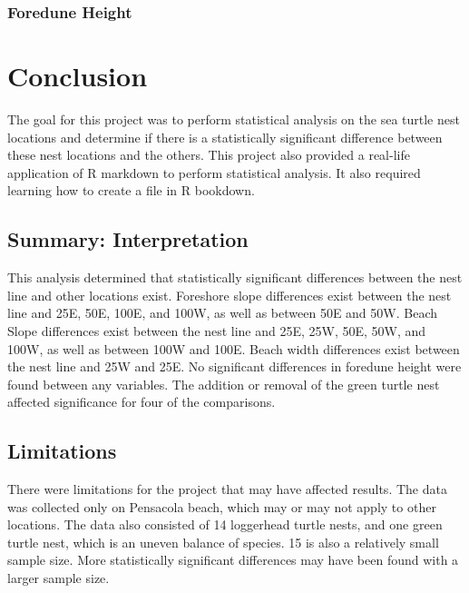 \documentclass[
]{article}
\begin{document}
\hypertarget{foredune-height}{%
\subsubsection{Foredune Height}\label{foredune-height}}

\hypertarget{conclusion}{%
\section{Conclusion}\label{conclusion}}

The goal for this project was to perform statistical analysis on the sea turtle nest locations and determine if there is a statistically significant difference between these nest locations and the others. This project also provided a real-life application of R markdown to perform statistical analysis. It also required learning how to create a file in R bookdown.

\hypertarget{summary-interpretation}{%
\subsection{Summary: Interpretation}\label{summary-interpretation}}

This analysis determined that statistically significant differences between the nest line and other locations exist. Foreshore slope differences exist between the nest line and 25E, 50E, 100E, and 100W, as well as between 50E and 50W. Beach Slope differences exist between the nest line and 25E, 25W, 50E, 50W, and 100W, as well as between 100W and 100E. Beach width differences exist between the nest line and 25W and 25E. No significant differences in foredune height were found between any variables. The addition or removal of the green turtle nest affected significance for four of the comparisons.

\hypertarget{limitations}{%
\subsection{Limitations}\label{limitations}}

There were limitations for the project that may have affected results. The data was collected only on Pensacola beach, which may or may not apply to other locations. The data also consisted of 14 loggerhead turtle nests, and one green turtle nest, which is an uneven balance of species. 15 is also a relatively small sample size. More statistically significant differences may have been found with a larger sample size.
\end{document}
